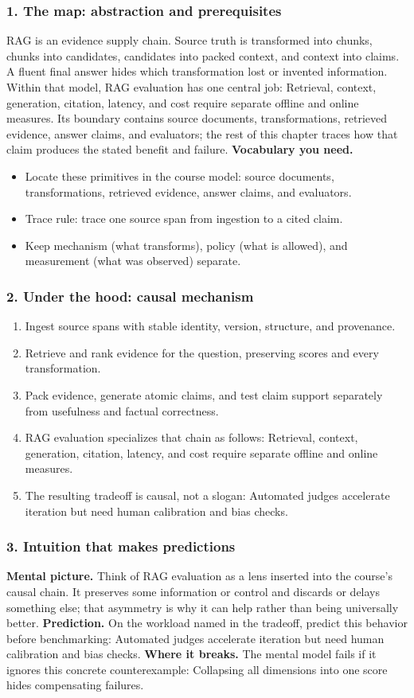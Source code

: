 \subsubsection*{1. The map: abstraction and prerequisites}
RAG is an evidence supply chain. Source truth is transformed into chunks, chunks into candidates, candidates into packed context, and context into claims. A fluent final answer hides which transformation lost or invented information.
Within that model, RAG evaluation has one central job: Retrieval, context, generation, citation, latency, and cost require separate offline and online measures. Its boundary contains source documents, transformations, retrieved evidence, answer claims, and evaluators; the rest of this chapter traces how that claim produces the stated benefit and failure.
\textbf{Vocabulary you need.}\begin{itemize}
\item Locate these primitives in the course model: source documents, transformations, retrieved evidence, answer claims, and evaluators.
\item Trace rule: trace one source span from ingestion to a cited claim.
\item Keep mechanism (what transforms), policy (what is allowed), and measurement (what was observed) separate.
\end{itemize}
\subsubsection*{2. Under the hood: causal mechanism}\begin{enumerate}
\item Ingest source spans with stable identity, version, structure, and provenance.
\item Retrieve and rank evidence for the question, preserving scores and every transformation.
\item Pack evidence, generate atomic claims, and test claim support separately from usefulness and factual correctness.
\item RAG evaluation specializes that chain as follows: Retrieval, context, generation, citation, latency, and cost require separate offline and online measures.
\item The resulting tradeoff is causal, not a slogan: Automated judges accelerate iteration but need human calibration and bias checks.
\end{enumerate}
\subsubsection*{3. Intuition that makes predictions}
\textbf{Mental picture.} Think of RAG evaluation as a lens inserted into the course's causal chain. It preserves some information or control and discards or delays something else; that asymmetry is why it can help rather than being universally better.
\textbf{Prediction.} On the workload named in the tradeoff, predict this behavior before benchmarking: Automated judges accelerate iteration but need human calibration and bias checks.
\textbf{Where it breaks.} The mental model fails if it ignores this concrete counterexample: Collapsing all dimensions into one score hides compensating failures.
